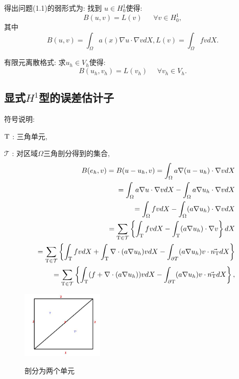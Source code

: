 \documentclass[9pt, a4paper,eqno]{article}
\theoremstyle{plain}
\begin{document}
\begin{CJK}{UTF8}{gkai}
得出问题(1.1)的弱形式为: 找到 $ u \in H_{0}^{1} $使得:
\begin{equation}
 B(u,v) = L(v)  ~~~~~~~\forall v \in H_{0}^{1},
\end{equation}
其中$$B(u,v) = \int _{\Omega} a(x) \nabla u \cdot \nabla v dX , L(v) = \int _{\Omega} fv dX.$$ 

有限元离散格式: 求$ u_{h} \in V_{h} $使得:
\begin{equation}
B(u_{h},v_{h}) = L(v_{h})~~~~~~\forall v_{h} \in V_{h} .
\end{equation}

\subsection{显式$H^{1}$型的误差估计子}
符号说明:

$\rm T $ : 三角单元, 

$ \mathcal{T}$ : 对区域$ \Omega $三角剖分得到的集合,
\begin{eqnarray}
&& B(e_{h},v) = B(u-u_{h},v) = \int _{\Omega} a \nabla (u - u_{h} )\cdot \nabla v dX
\nonumber\\&& =\int _{\Omega} a\nabla u  \cdot \nabla v dX - \int _{\Omega} a \nabla u_{h} \cdot \nabla v dX  
\nonumber\\&& = \int _{\Omega} fv dX - \int _{\Omega} (a \nabla u_{h}) \cdot \nabla v dX
\nonumber\\&& = \sum_{  \rm T \in \mathcal{T} }  \left\lbrace \int _{\rm T} fv dX - \int _{\rm T} (a \nabla u_{h}) \cdot \nabla v \right\rbrace  dX   
\nonumber\\&& = \sum_{ \rm T \in \mathcal{T} } \left\lbrace \int _{\rm T} fv dX + \int _{\rm T } \nabla \cdot (a \nabla u_{h})v dX - \int _{\partial T} (a \nabla u_{h}) v \cdot \vec{n_{\rm T}} dX \right\rbrace
\nonumber\\&& =  \sum_{ \rm T \in \mathcal{T} }  \left\lbrace  \int _{\rm T } (f+ \nabla \cdot (a \nabla u_{h}) )v dX  - \int _{\partial \rm T} (a \nabla u_{h}) v \cdot \vec{n_{\rm T}} dX \right\rbrace,
\label{A1anotherboun}
\end{eqnarray}

\begin{figure}[htbp!]
\begin{center}
 {\includegraphics[width=0.35\textwidth]{figure-1.jpg}}
\caption{\small{剖分为两个单元
}} \label{logerrorandm}
\end{center}
\end{figure}


\end{CJK}
\end{document}
